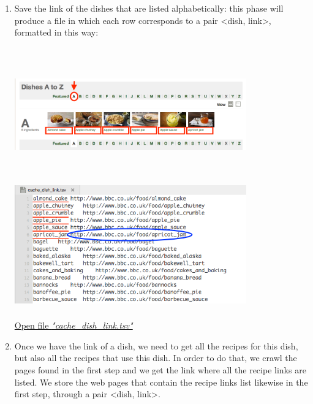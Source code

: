 \documentclass[oneside]{article}			%
\begin{document}
	\begin{enumerate}[label=\arabic*.]
		\item Save the link of the dishes that are listed alphabetically: this phase will produce a file in which each row corresponds to a pair <dish, link>, formatted in this way:
		\\\\
		\hspace*{-1in}\includegraphics[width=10cm, height=5.5cm]{./report_file/img/4_1_1_ex.png}\includegraphics[width=10cm, height=5.5cm]{./report_file/img/cache_dish_link.png}
		\begin{flushright}\href{run:./report_file/cache_dish_link.tsv}{Open file \textit{"cache\_dish\_link.tsv"}}\end{flushright}
		\clearpage
		\item	Once we have the link of a dish, we need to get all the recipes for this dish, but also all the recipes that use this dish. In order to do that, we crawl the pages found in the first step and we get the link where all the recipe links are listed. We store the web pages that contain the recipe links list likewise in the first step, through a pair <dish, link>.
		\\\\

\end{enumerate}
\end{document}
